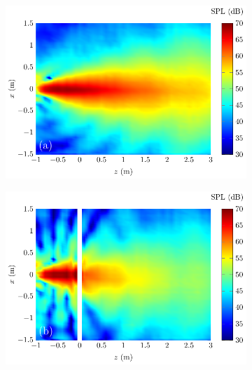 \begin{figure}[!htb]
    \centering
    \begin{subfigure}{0.49\textwidth}
        \centering
        \includegraphics[width = \textwidth]{fig/Exp_AnalyzeData_211211R_1000Hz_NoSphere_211211T}
    \end{subfigure}
    \begin{subfigure}{0.49\textwidth}
        \centering
        \includegraphics[width = \textwidth]{fig/Exp_AnalyzeData_211211R_1000Hz_Sphere_211211S}
    \end{subfigure}
    \\
    \begin{subfigure}{0.49\textwidth}
        \centering

\end{subfigure}
\end{figure}

